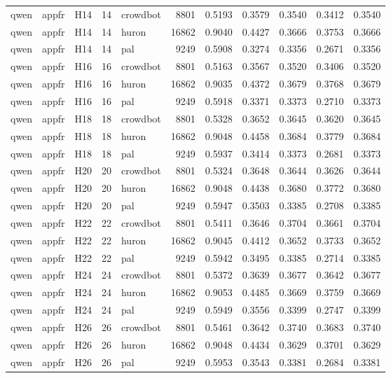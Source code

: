 \begin{table}[tbp]
\begin{tabular}{lllrlrrrrrr}
qwen & appfr & H14 & 14 & crowdbot & 8801 & 0.5193 & 0.3579 & 0.3540 & 0.3412 & 0.3540 \\
qwen & appfr & H14 & 14 & huron & 16862 & 0.9040 & 0.4427 & 0.3666 & 0.3753 & 0.3666 \\
qwen & appfr & H14 & 14 & pal & 9249 & 0.5908 & 0.3274 & 0.3356 & 0.2671 & 0.3356 \\
qwen & appfr & H16 & 16 & crowdbot & 8801 & 0.5163 & 0.3567 & 0.3520 & 0.3406 & 0.3520 \\
qwen & appfr & H16 & 16 & huron & 16862 & 0.9035 & 0.4372 & 0.3679 & 0.3768 & 0.3679 \\
qwen & appfr & H16 & 16 & pal & 9249 & 0.5918 & 0.3371 & 0.3373 & 0.2710 & 0.3373 \\
qwen & appfr & H18 & 18 & crowdbot & 8801 & 0.5328 & 0.3652 & 0.3645 & 0.3620 & 0.3645 \\
qwen & appfr & H18 & 18 & huron & 16862 & 0.9048 & 0.4458 & 0.3684 & 0.3779 & 0.3684 \\
qwen & appfr & H18 & 18 & pal & 9249 & 0.5937 & 0.3414 & 0.3373 & 0.2681 & 0.3373 \\
qwen & appfr & H20 & 20 & crowdbot & 8801 & 0.5324 & 0.3648 & 0.3644 & 0.3626 & 0.3644 \\
qwen & appfr & H20 & 20 & huron & 16862 & 0.9048 & 0.4438 & 0.3680 & 0.3772 & 0.3680 \\
qwen & appfr & H20 & 20 & pal & 9249 & 0.5947 & 0.3503 & 0.3385 & 0.2708 & 0.3385 \\
qwen & appfr & H22 & 22 & crowdbot & 8801 & 0.5411 & 0.3646 & 0.3704 & 0.3661 & 0.3704 \\
qwen & appfr & H22 & 22 & huron & 16862 & 0.9045 & 0.4412 & 0.3652 & 0.3733 & 0.3652 \\
qwen & appfr & H22 & 22 & pal & 9249 & 0.5942 & 0.3495 & 0.3385 & 0.2714 & 0.3385 \\
qwen & appfr & H24 & 24 & crowdbot & 8801 & 0.5372 & 0.3639 & 0.3677 & 0.3642 & 0.3677 \\
qwen & appfr & H24 & 24 & huron & 16862 & 0.9053 & 0.4485 & 0.3669 & 0.3759 & 0.3669 \\
qwen & appfr & H24 & 24 & pal & 9249 & 0.5949 & 0.3556 & 0.3399 & 0.2747 & 0.3399 \\
qwen & appfr & H26 & 26 & crowdbot & 8801 & 0.5461 & 0.3642 & 0.3740 & 0.3683 & 0.3740 \\
qwen & appfr & H26 & 26 & huron & 16862 & 0.9048 & 0.4434 & 0.3629 & 0.3701 & 0.3629 \\
qwen & appfr & H26 & 26 & pal & 9249 & 0.5953 & 0.3543 & 0.3381 & 0.2684 & 0.3381 \\

\end{tabular}
\end{table}
